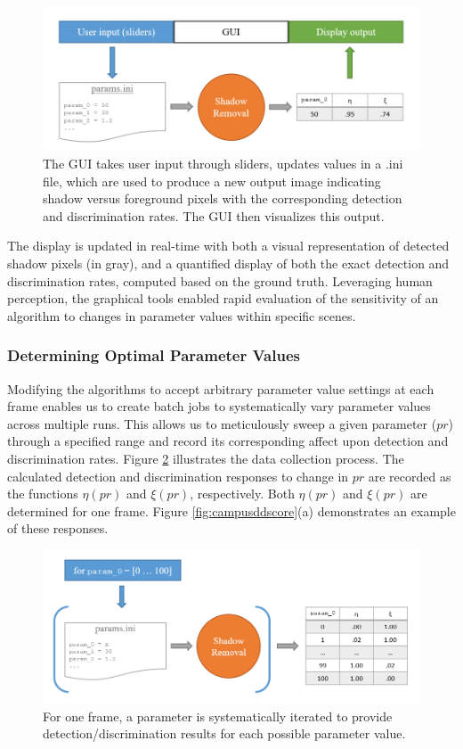 \begin{figure}
  \centering
  \includegraphics[width=1\linewidth]{figures/gui_model.png}
  \caption{The GUI takes user input through sliders, updates values in a .ini file, which are used to produce a new output image indicating shadow versus foreground pixels with the corresponding detection and discrimination rates. The GUI then visualizes this output.}
  \label{fig:guimodel}
\end{figure}

The display is updated in real-time with both a visual representation of detected shadow pixels (in gray), and a quantified display of both the exact detection and discrimination rates, computed based on the ground truth. Leveraging human perception, the graphical tools enabled rapid evaluation of the sensitivity of an algorithm to changes in parameter values within specific scenes.

\FloatBarrier
\subsubsection{Determining Optimal Parameter Values}

Modifying the algorithms to accept arbitrary parameter value settings at each frame enables us to create batch jobs to systematically vary parameter values across multiple runs. This allows us to meticulously sweep a given parameter ($pr$) through a specified range and record its corresponding affect upon detection and discrimination rates. Figure \ref{fig:guiiterate} illustrates the data collection process. The calculated detection and discrimination responses to change in $pr$ are recorded as the functions $\eta(pr)$ and $\xi(pr)$, respectively. Both $\eta(pr)$ and $\xi(pr)$ are determined for one frame. Figure \ref{fig:campusddscore}(a) demonstrates an example of these responses.

\begin{figure}
  \centering
  \includegraphics[width=1\linewidth]{figures/gui_iterate.png}
  \caption{For one frame, a parameter is systematically iterated to provide detection/discrimination results for each possible parameter value.}
  \label{fig:guiiterate}
\end{figure}


